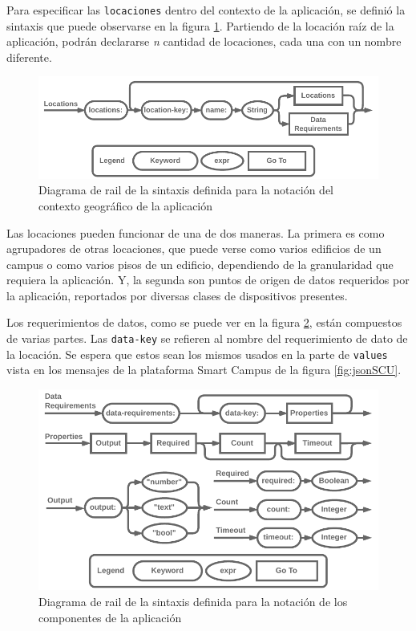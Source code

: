 Para especificar las \texttt{locaciones} dentro del contexto de la aplicación, se definió la sintaxis que puede observarse en la figura \ref{fig:rail-location}. Partiendo de la locación raíz de la aplicación, podrán declararse \textit{n} cantidad de locaciones, cada una con un nombre diferente.

\begin{figure}[H]
    \centering
    \caption{Diagrama de rail de la sintaxis definida para la notación del contexto geográfico de la aplicación}
    \label{fig:rail-location}
    \vspace{-2mm}
    \includegraphics[width=\linewidth]{images/Railroad Locations Alt.pdf}
\end{figure}

Las locaciones pueden funcionar de una de dos maneras. La primera es como agrupadores de otras locaciones, que puede verse como varios edificios de un campus o como varios pisos de un edificio, dependiendo de la granularidad que requiera la aplicación. Y, la segunda son puntos de origen de datos requeridos por la aplicación, reportados por diversas clases de dispositivos presentes.

Los requerimientos de datos, como se puede ver en la figura \ref{fig:rail-data-req}, están compuestos de varias partes. Las \texttt{data-key} se refieren al nombre del requerimiento de dato de la locación. Se espera que estos sean los mismos usados en la parte de \texttt{values} vista en los mensajes de la plataforma Smart Campus de la figura \ref{fig:jsonSCU}.

\begin{figure}[H]
    \centering
    \caption{Diagrama de rail de la sintaxis definida para la notación de los componentes de la aplicación}
    \label{fig:rail-data-req}
    \vspace{-2mm}
    \includegraphics[width=0.9\linewidth]{images/Railroad Data Requirements.pdf}
\end{figure}

